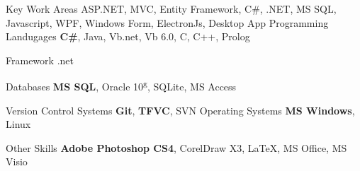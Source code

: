 

\begin{cvskills}
\cvskill
{Key Work Areas} %
{ASP.NET, MVC, Entity Framework, C\#, .NET, MS SQL, Javascript, WPF, Windows Form, ElectronJs, Desktop App} %
  \cvskill
    {Programming Landugages} %
    {\textbf{C\#}, Java, Vb.net, Vb 6.0, C, C++, Prolog} %
    
 \cvskill
{Framework} %
{.net} %
  
  \cvskill
    {Databases} %
    {\textbf{MS SQL}, Oracle 10\textsuperscript{g}, SQLite, MS Access} %
    
   \cvskill
 {Version Control Systems} %
 {\textbf{Git}, \textbf{TFVC}, SVN } %
 \cvskill
 {Operating Systems} %
 {\textbf{MS Windows}, Linux} %
 
\cvskill
{Other Skills} %
{\textbf{Adobe Photoshop CS4}, CorelDraw X3, \LaTeX, MS Office, MS Visio} %

\end{cvskills}

